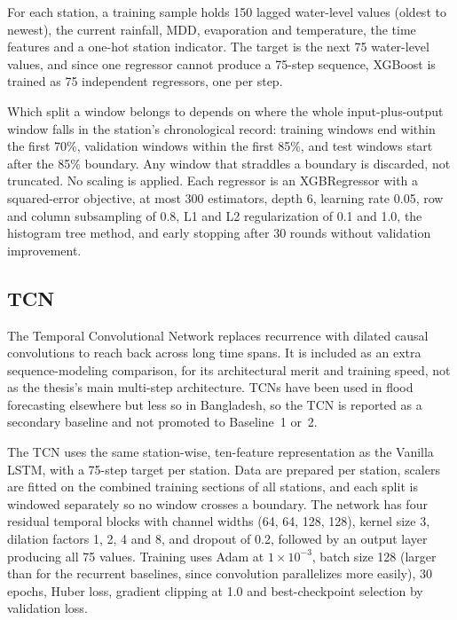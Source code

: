 For each station, a training sample holds 150 lagged water-level values (oldest
to newest), the current rainfall, MDD, evaporation and temperature, the time
features and a one-hot station indicator. The target is the next 75 water-level
values, and since one regressor cannot produce a 75-step sequence, XGBoost is
trained as 75 independent regressors, one per step.

Which split a window belongs to depends on where the whole input-plus-output
window falls in the station's chronological record: training windows end within
the first 70\%, validation windows within the first 85\%, and test windows start
after the 85\% boundary. Any window that straddles a boundary is discarded, not
truncated. No scaling is applied. Each regressor is an XGBRegressor with a
squared-error objective, at most 300 estimators, depth 6, learning rate 0.05,
row and column subsampling of 0.8, L1 and L2 regularization of 0.1 and 1.0, the
histogram tree method, and early stopping after 30 rounds without validation
improvement.

\subsection{TCN}
\label{sec:3.13.4}

The Temporal Convolutional Network replaces recurrence with dilated causal
convolutions to reach back across long time spans. It is included as an extra
sequence-modeling comparison, for its architectural merit and training speed,
not as the thesis's main multi-step architecture. TCNs have been used in flood
forecasting elsewhere \cite{Ni2024,Lin2021,Li2024,Li2025} but less so in
Bangladesh, so the TCN is reported as a secondary baseline and not promoted to
Baseline~1 or~2.

The TCN uses the same station-wise, ten-feature representation as the Vanilla
LSTM, with a 75-step target per station. Data are prepared per station, scalers
are fitted on the combined training sections of all stations, and each split is
windowed separately so no window crosses a boundary. The network has four
residual temporal blocks with channel widths (64, 64, 128, 128), kernel size 3,
dilation factors 1, 2, 4 and 8, and dropout of 0.2, followed by an output layer
producing all 75 values. Training uses Adam at $1\times10^{-3}$, batch size 128
(larger than for the recurrent baselines, since convolution parallelizes more
easily), 30 epochs, Huber loss, gradient clipping at 1.0 and best-checkpoint
selection by validation loss.

